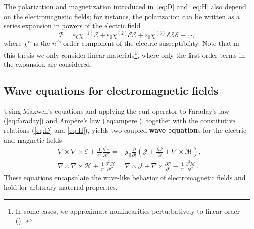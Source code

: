 The polarization and magnetization introduced in~\eqref{eq:D} and~\eqref{eq:H} also depend on the electromagnetic
fields; for instance, the
polarization can be written as a series expansion in powers of the electric
field
\begin{equation}\label{eq:polarization}
\bm{\mathcal{P}}=\mathcal{\varepsilon}_0 \bm{\mathcal{\chi}}^{(1)}
 \bm{\mathcal{E}}+\mathcal{\varepsilon}_0 \bm{\mathcal{\chi}}^{(2)}
 \bm{\mathcal{E}} \bm{\mathcal{E}}+\mathcal{\varepsilon}_0
 \bm{\mathcal{\chi}}^{(3)} \bm{\mathcal{E}} \bm{\mathcal{E}}
 \bm{\mathcal{E}}+\cdots,
\end{equation}
where $\bm{\mathcal{\chi}}^{n}$ is the $n^\text{th}$ order component of the
electric susceptibility. Note that in this thesis
we only consider linear materials\footnote{In some cases, we approximate nonlinearities perturbatively to linear
order ()~\cite{ownpub4}.}, where only the first-order terms in the expansion are
considered. \\

\subsection*{Wave equations for electromagnetic fields}

Using Maxwell's equations and applying the curl operator to Faraday's law
    (\eqref{eq:faraday}) and Ampère's law (\eqref{eq:ampere}),
together with the constitutive relations (\eqref{eq:D} and
        \eqref{eq:H}), yields two coupled
\textbf{wave equation}s for the electric and magnetic fields
\begin{equation}
    \begin{aligned}
         & \nabla \times \nabla \times \bm{\mathcal{E}}+\frac{1}{c^2}
        \frac{\partial^2 \bm{\mathcal{E}}}{\partial t^2}=-\mu_0
        \frac{\partial}{\partial t}\left(\bm{\mathcal{J}}+\frac{\partial
        \bm{\mathcal{P}}}{\partial t}+\nabla \times \bm{\mathcal{M}}\right), \\
         & \nabla \times \nabla \times \bm{\mathcal{H}}+\frac{1}{c^2}
        \frac{\partial^2 \bm{\mathcal{H}}}{\partial t^2}=\nabla \times
        \bm{\mathcal{J}}+\nabla \times \frac{\partial \bm{\mathcal{P}}}{\partial
            t}-\frac{1}{c^2} \frac{\partial^2 \bm{\mathcal{M}}}{\partial t^2}\,.
    \end{aligned}
\end{equation}
These
equations encapsulate the wave-like behavior of electromagnetic fields and
hold for arbitrary material properties.

